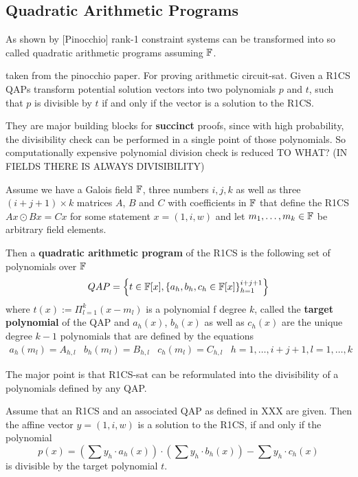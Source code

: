 \subsection{Quadratic Arithmetic Programs}
As shown by [Pinocchio] rank-1 constraint systems can be transformed into so called quadratic  arithmetic  programs  assuming $\mathbb{F}$.

taken from the pinocchio paper. For proving arithmetic circuit-sat.  Given a R1CS QAPs transform potential solution vectors into two polynomials $p$ and $t$, such that $p$ is divisible by $t$ if and only if the vector is a solution to the R1CS. 

They are major building blocks for \textbf{succinct} proofs, since with high probability, the divisibility check can be performed in a single point of those polynomials. So computationally expensive polynomial division check is reduced TO WHAT? (IN FIELDS THERE IS ALWAYS DIVISIBILITY) 

\begin{definition}
Assume we have a Galois field $\mathbb{F}$, three numbers $i,j,k$ as well as three $(i+j+1) \times k$ matrices $A$, $B$ and $C$  with coefficients in $\mathbb{F}$ that define the R1CS
$Ax \odot Bx = Cx $ for some statement $x=(1,i,w)$ and let $m_1,\ldots,m_k\in \mathbb{F}$ be arbitrary field elements. 

Then a \textbf{quadratic arithmetic program} of the R1CS is the following set of polynomials over $\mathbb{F}$
$$
QAP = \left\{t\in \mathbb{F}[x],\left\{a_h,b_h,c_h\in \mathbb{F}[x]\right\}_{h=1}^{i+j+1}\right\}
$$
where $t(x) := \Pi_{l=1}^k (x- m_l)$ is a polynomial f degree $k$, called the \textbf{target polynomial} of the QAP and $a_h(x)$, $b_h(x)$ as well as $c_h(x)$ are the unique degree $k-1$ polynomials that are defined by the equations
$$
\begin{array}{lllr}
a_h(m_l)=A_{h,l} & b_h(m_l)=B_{h,l} & c_h(m_l)=C_{h,l} & h= 1, \ldots , i+j+1, l=1,\ldots,k 
\end{array}
$$  
\end{definition}
The major point is that R1CS-sat can be reformulated into the divisibility of a polynomials defined by any QAP.
\begin{theorem}
Assume that an R1CS and an associated QAP as defined in XXX are given. Then the affine vector $y=(1,i,w)$ is a solution to the R1CS, if and only if the polynomial
$$
p(x) = \left(\sum y_h\cdot a_h(x)\right)\cdot \left(\sum y_h\cdot b_h(x)\right)  - \sum y_h\cdot c_h(x) 
$$
is divisible by the target polynomial $t$.
\end{theorem}

